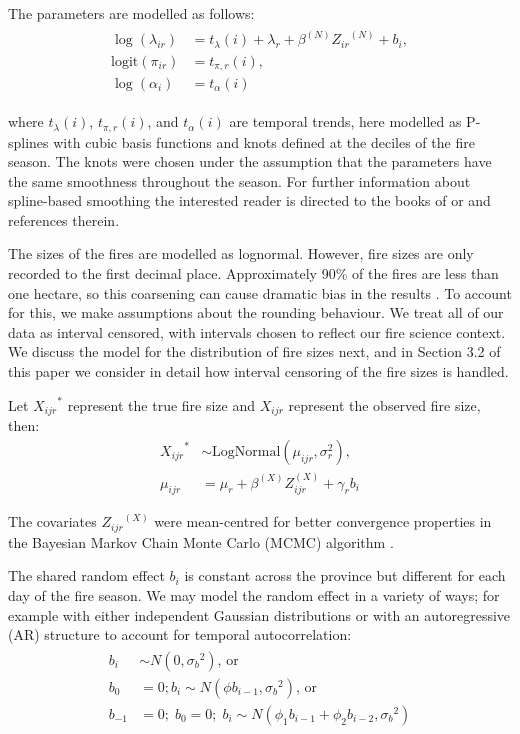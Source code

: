 \documentclass[10pt,letterpaper]{article}
\begin{document}
The parameters are modelled as follows:
\begin{align}
\begin{split}
\log(\lambda_{ir}) &= t_\lambda(i) + \lambda_r + \beta^{(N)} {Z_{ir}}^{(N)} + b_i,\\
\text{logit}(\pi_{ir}) &= t_{\pi,r}(i),\\
\log(\alpha_i) &= t_\alpha(i)
\end{split}
\label{Nirlp}
\end{align}

\noindent where \(t_\lambda(i)\), \(t_{\pi,r}(i)\), and \(t_\alpha(i)\) are
temporal trends, here modelled as P-splines with cubic basis functions \cite{langBayesianPSplines2004}
and knots defined at the deciles of the fire season. The knots were chosen under the assumption that the parameters have the same smoothness throughout the season. For further information about spline-based smoothing the interested reader is directed to the books of \cite{ramsayFunctionalDataAnalysis2006} or \cite{woodGeneralizedAdditiveModels2017} and references therein.

The sizes of the fires are modelled as lognormal. However, fire sizes
are only recorded to the first decimal place. Approximately 90\% of the
fires are less than one hectare, so this coarsening can cause dramatic
bias in the results \cite{lawEffectsMidpointImputation1992}. To account for this, we make
assumptions about the rounding behaviour. We treat all of our data as
interval censored, with intervals chosen to reflect our fire science
context. We discuss the model for the distribution of fire sizes
next, and in Section 3.2 of this paper we consider in detail how interval censoring of
the fire sizes is handled.

Let \({X_{ijr}}^*\) represent the true fire size and \(X_{ijr}\) represent
the observed fire size, then: \begin{align}
{X_{ijr}}^* &\sim \text{LogNormal}(\mu_{ijr}, \sigma^2_{r}),\\
\mu_{ijr} &= \mu_r + \beta^{(X)} Z_{ijr}^{(X)} + \gamma_rb_i
\label{Xijr1}
\end{align}

The covariates ${Z_{ijr}}^{(X)}$ were mean-centred for better convergence
properties in the Bayesian Markov Chain Monte Carlo (MCMC) algorithm
\cite{kruschkeDoingBayesianData2015}.

The shared random effect \(b_i\) is constant across the province but
different for each day of the fire season. We may model the random
effect in a variety of ways; for example with either independent
Gaussian distributions or with an autoregressive (AR) structure to account
for temporal autocorrelation: \begin{align}
\begin{split}
b_i &\sim N(0, {\sigma_b}^2)\text{, or}\\
b_0 &= 0; b_i \sim N(\phi b_{i-1}, {\sigma_b}^2)\text{, or}\\
b_{-1} &= 0;\; b_0 = 0;\; b_i \sim N(\phi_1 b_{i-1} + \phi_2 b_{i-2}, {\sigma_b}^2)
\label{ar12}
\end{split}
\end{align}
\end{document}
